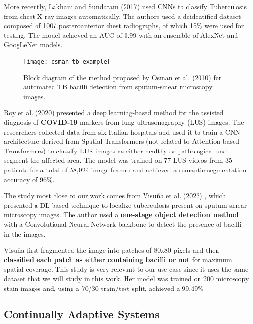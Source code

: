\documentclass[../main.tex]{subfiles}
\begin{document}
    More recently, Lakhani and Sundaram (2017) used CNNs to classify Tuberculosis from chest X-ray images automatically. The authors used a deidentified dataset composed of 1007 posteroanterior chest radiographs, of which 15\% were used for testing. The model achieved an AUC of 0.99 with an ensemble of AlexNet \cite{krizhevskyImageNetClassificationDeep2012} and GoogLeNet \cite{szegedyGoingDeeperConvolutions2014} models.
    
    \begin{figure}[h]
       \centering
       \texttt{[image: osman\_tb\_example]}
       \caption{Block diagram of the method proposed by Osman et al. (2010) \cite{osmanDetectionMycobacteriumTuberculosis2010} for automated TB bacilli detection from sputum-smear microscopy images.}
       \label{fig:visuna_method}
    \end{figure}
    \clearpage

    Roy et al. (2020) \cite{royDeepLearningClassification2020} presented a deep learning-based method for the assisted diagnosis of \textbf{COVID-19} markers from lung ultrasonography (LUS) images. The researchers collected data from six Italian hospitals and used it to train a CNN architecture derived from Spatial Transformers \cite{jaderbergSpatialTransformerNetworks2016} (not related to Attention-based Transformers) to classify LUS images as either healthy or pathological and segment the affected area. The model was trained on 77 LUS videos from 35 patients for a total of 58,924 image frames and achieved a semantic segmentation accuracy of 96\%.
    

     The study most close to our work comes from Visuña et al. (2023) \cite{visuna_novel_2023}, which presented a DL-based technique to localize tuberculosis present on sputum smear microscopy images. The author used a \textbf{one-stage object detection method} with a Convolutional Neural Network backbone to detect the presence of bacilli in the images. 
     
     Visuña first fragmented the image into patches of 80x80 pixels and then \textbf{classified each patch as either containing bacilli or not} for maximum spatial coverage. This study is very relevant to our use case since it uses the same dataset that we will study in this work. Her model was trained on 200 microscopy stain images and, using a 70/30 train/test split, achieved a 99.49\% %

    
    \subsection{Continually Adaptive Systems} \label{sec:continually_adaptive_systems_sota} 
\end{document}
